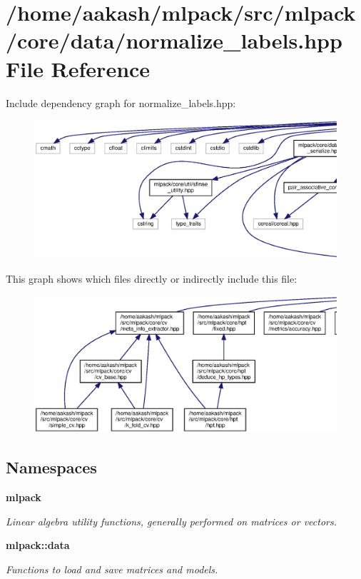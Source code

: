 \section{/home/aakash/mlpack/src/mlpack/core/data/normalize\+\_\+labels.hpp File Reference}
\label{normalize__labels_8hpp}
Include dependency graph for normalize\+\_\+labels.\+hpp\+:
\nopagebreak
\begin{figure}[H]
\begin{center}
\leavevmode
\includegraphics[width=350pt]{normalize__labels_8hpp__incl}
\end{center}
\end{figure}
This graph shows which files directly or indirectly include this file\+:
\nopagebreak
\begin{figure}[H]
\begin{center}
\leavevmode
\includegraphics[width=350pt]{normalize__labels_8hpp__dep__incl}
\end{center}
\end{figure}
\subsection*{Namespaces}
\begin{DoxyCompactItemize}
\item 
 \textbf{ mlpack}
\begin{DoxyCompactList}\small\item\em Linear algebra utility functions, generally performed on matrices or vectors. \end{DoxyCompactList}\item 
 \textbf{ mlpack\+::data}
\begin{DoxyCompactList}\small\item\em Functions to load and save matrices and models. \end{DoxyCompactList}\end{DoxyCompactItemize}
